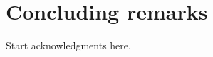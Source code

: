 \documentclass[12pt,english]{article}
\providecommand{\tabularnewline}{\\}
\begin{document}
\section{Concluding remarks}

\begin{acknowledgment} Start acknowledgments here. \end{acknowledgment}

 {} {\clearpage{}} 




%




%


\end{document}
